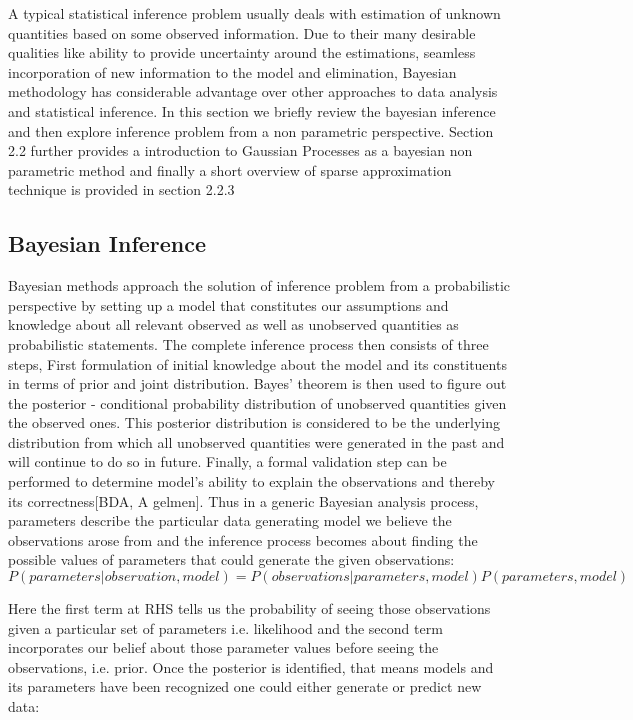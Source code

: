 A typical statistical inference problem usually deals with estimation of unknown quantities based on some observed information. Due to their many desirable qualities like ability to provide uncertainty around the estimations, seamless incorporation of new information to the model and elimination, Bayesian methodology has considerable advantage over other approaches to data analysis and statistical inference. In this section we briefly review the bayesian inference and then explore inference problem from a non parametric perspective. Section 2.2 further provides a introduction to Gaussian Processes as a bayesian non parametric method and finally a short overview of sparse approximation technique is provided in section 2.2.3

\subsection{Bayesian Inference}

Bayesian methods approach the solution of inference problem from a probabilistic perspective by setting up a model that constitutes our assumptions and knowledge about all relevant observed as well as unobserved quantities as probabilistic statements. 
The complete inference process then consists of three steps, First formulation of initial knowledge about the model and its constituents in terms of prior and joint distribution. Bayes’ theorem is then used to figure out the posterior - conditional probability distribution of unobserved quantities given the observed ones. This posterior distribution is considered to be the underlying distribution from which all unobserved quantities were generated in the past and will continue to do so in future. Finally, a formal validation step can be performed to determine model’s ability to explain the observations and thereby its correctness[BDA, A gelmen].
Thus in a generic Bayesian analysis process, parameters describe the particular data generating model we believe the observations arose from and the inference process becomes about finding the possible values of parameters that could generate the given observations:
\begin{equation}
\scriptstyle
P(parameters | observation, model) =  P(observations | parameters, model) P(parameters,model)
\end{equation}

Here the first term at RHS tells us the probability of seeing those observations given a particular set of parameters i.e. likelihood and the second term incorporates our belief about those parameter values before seeing the observations, i.e. prior.
Once the posterior is identified, that means models and its parameters have been recognized one could either generate or predict new data:

